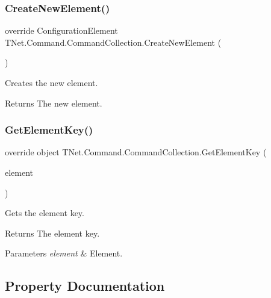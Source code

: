 \subsubsection{\texorpdfstring{Create\+New\+Element()}{CreateNewElement()}}
{\footnotesize\ttfamily override Configuration\+Element T\+Net.\+Command.\+Command\+Collection.\+Create\+New\+Element (\begin{DoxyParamCaption}{ }\end{DoxyParamCaption})\hspace{0.3cm}{\ttfamily [protected]}}



Creates the new element. 

\begin{DoxyReturn}{Returns}
The new element.
\end{DoxyReturn}
\mbox{\label{class_t_net_1_1_command_1_1_command_collection_afc986053d2fb63b0bd015e8538aed181}} 
\subsubsection{\texorpdfstring{Get\+Element\+Key()}{GetElementKey()}}
{\footnotesize\ttfamily override object T\+Net.\+Command.\+Command\+Collection.\+Get\+Element\+Key (\begin{DoxyParamCaption}\item[{Configuration\+Element}]{element }\end{DoxyParamCaption})\hspace{0.3cm}{\ttfamily [protected]}}



Gets the element key. 

\begin{DoxyReturn}{Returns}
The element key.
\end{DoxyReturn}

\begin{DoxyParams}{Parameters}
{\em element} & Element.\\
\hline
\end{DoxyParams}


\subsection{Property Documentation}
\mbox{\label{class_t_net_1_1_command_1_1_command_collection_aab73e8d2b4b87e345604120e19db234a}} 
